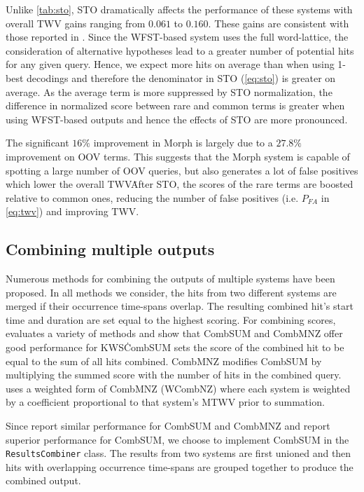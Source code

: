 \documentclass[a4paper,oneside,reqno]{amsart}
\begin{document}
Unlike \autoref{tab:sto}, STO dramatically affects the performance of these
systems with overall TWV gains ranging from $0.061$ to $0.160$. These gains are
consistent with those reported in \cite{mamou2013system}. Since the WFST-based
system uses the full word-lattice, the consideration of alternative hypotheses
lead to a greater number of potential hits for any given query. Hence, we
expect more hits on average than when using 1-best decodings and therefore the
denominator in STO (\autoref{eq:sto}) is greater on average. As the average
term is more suppressed by STO normalization, the difference in normalized
score between rare and common terms is greater when using WFST-based outputs
and hence the effects of STO are more pronounced.

The significant $16\%$ improvement in Morph is largely due to a $27.8\%$
improvement on OOV terms. This suggests that the Morph system is capable of
spotting a large number of OOV queries, but also generates a lot of false
positives which lower the overall TWV\. After STO, the scores of the rare
terms are boosted relative to common ones, reducing the number of false
positives (i.e. $P_{FA}$ in \autoref{eq:twv}) and improving TWV.

\subsection{Combining multiple outputs}

Numerous methods for combining the outputs of multiple systems have been
proposed. In all methods we consider, the hits from two different systems are
merged if their occurrence time-spans overlap. The resulting combined hit's
start time and duration are set equal to the highest scoring. For combining
scores, \cite{soto2014comparison} evaluates a variety of methods and show that
CombSUM and CombMNZ offer good performance for KWS\. CombSUM sets the score of
the combined hit to be equal to the sum of all hits combined. CombMNZ modifies
CombSUM by multiplying the summed score with the number of hits in the combined
query. \cite{mamou2013system} uses a weighted form of CombMNZ (WCombNZ) where
each system is weighted by a coefficient proportional to that system's MTWV
prior to summation.

Since \cite{soto2014comparison} report similar performance for CombSUM and
CombMNZ and \cite{belkin1995combining} report superior performance for CombSUM,
we choose to implement CombSUM in the \texttt{ResultsCombiner} class. The
results from two systems are first unioned and then hits with overlapping
occurrence time-spans are grouped together to produce the combined output.
\end{document}
